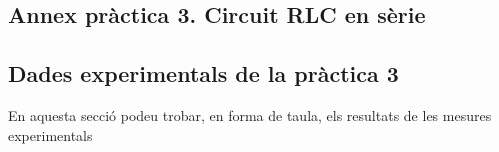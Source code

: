 \documentclass[a4paper,10.5pt]{report}
\begin{document}
\begin{appendices}
\section{Annex pràctica 3. Circuit RLC en sèrie}
\subsection{Dades experimentals de la pràctica 3}
En aquesta secció podeu trobar, en forma de taula, els resultats de les mesures experimentals





\end{appendices}
\end{document}
